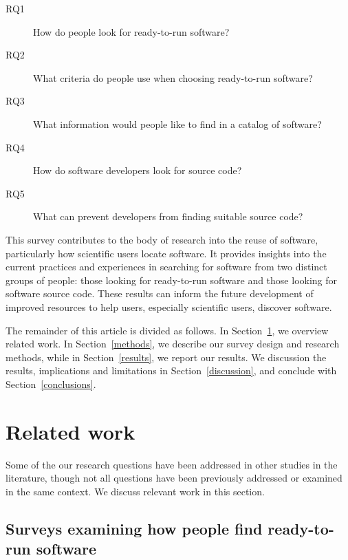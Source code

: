 \documentclass[review]{elsarticle}
\begin{document}
\newcommand{\rqonetext}{How do people look for ready-to-run software?\xspace}
\newcommand{\rqtwotext}{What criteria do people use when choosing ready-to-run software?\xspace}
\newcommand{\rqthreetext}{What information would people like to find in a catalog of software?\xspace}
\newcommand{\rqfourtext}{How do software developers look for source code?\xspace}
\newcommand{\rqfivetext}{What can prevent developers from finding suitable source code?\xspace}

\begin{description}

\item[RQ1] \rqonetext
\item[RQ2] \rqtwotext
\item[RQ3] \rqthreetext
\item[RQ4] \rqfourtext
\item[RQ5] \rqfivetext

\end{description}

This survey contributes to the body of research into the reuse of software, particularly how scientific users locate software.  It provides insights into the current practices and experiences in searching for software from two distinct groups of people: those looking for ready-to-run software and those looking for software source code.  These results can inform the future development of improved resources to help users, especially scientific users, discover software.

The remainder of this article is divided as follows. In Section~\ref{related-work}, we overview related work.  In Section~\ref{methods}, we describe our survey design and research methods, while in Section~\ref{results}, we report our results.  We discussion the results, implications and limitations in Section~\ref{discussion}, and conclude with Section~\ref{conclusions}.


\section{Related work}
\label{related-work}

Some of the our research questions have been addressed in other studies in the literature, though not all questions have been previously addressed or examined in the same context.  We discuss relevant work in this section.


\subsection{Surveys examining how people find ready-to-run software}
\end{document}
